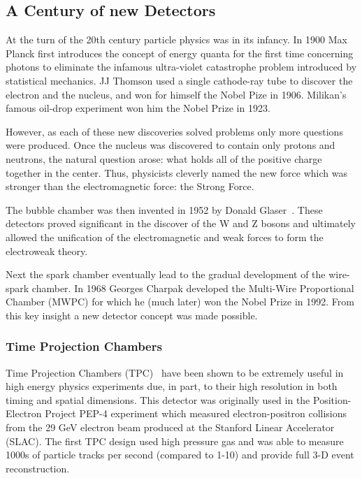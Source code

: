 \subsection{A Century of new Detectors}

At the turn of the 20th century particle physics was in its infancy.
In 1900 Max Planck first introduces the concept of energy quanta for the first time concerning photons to eliminate the infamous ultra-violet catastrophe problem introduced by statistical mechanics.
JJ Thomson used a single cathode-ray tube to discover the electron and the nucleus, and won for himself the Nobel Pize in 1906.
Milikan's famous oil-drop experiment won him the Nobel Prize in 1923.

However, as each of these new discoveries solved problems only more questions were produced.
Once the nucleus was discovered to contain only protons and neutrons, the natural question arose: what holds all of the positive charge together in the center.
Thus, physicists cleverly named the new force which was stronger than the electromagnetic force: the Strong Force.

The bubble chamber was then invented in 1952 by Donald Glaser~\citep{bubbleChamber_PhysRev.87.665}.
These detectors proved significant in the discover of the W and Z bosons and ultimately allowed the unification of the electromagnetic and weak forces to form the electroweak theory.

Next the spark chamber eventually lead to the gradual development of the wire-spark chamber.
In 1968 Georges Charpak developed the Multi-Wire Proportional Chamber (MWPC) for which he (much later) won the Nobel Prize in 1992.
From this key insight a new detector concept was made possible.

\subsubsection{Time Projection Chambers}

Time Projection Chambers (TPC)~\citep{lartpc:nygren} have been shown to be extremely useful in high energy physics experiments due, in part, to their high resolution in both timing and spatial dimensions.
This detector was originally used in the Position-Electron Project PEP-4 experiment which measured electron-positron collisions from the 29 GeV electron beam produced at the Stanford Linear Accelerator (SLAC).
The first TPC design used high pressure gas and was able to measure 1000s of particle tracks per second (compared to 1-10) and provide full 3-D event reconstruction.


